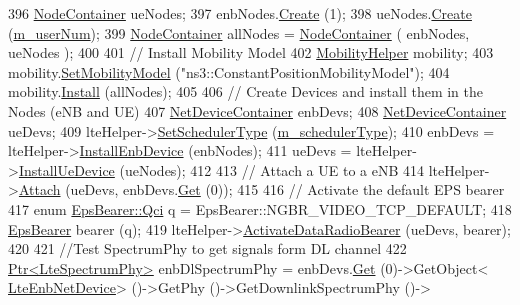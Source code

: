 \begin{DoxyCode}
396   \hyperlink{classns3_1_1NodeContainer}{NodeContainer} ueNodes;
397   enbNodes.\hyperlink{classns3_1_1NodeContainer_a787f059e2813e8b951cc6914d11dfe69}{Create} (1);
398   ueNodes.\hyperlink{classns3_1_1NodeContainer_a787f059e2813e8b951cc6914d11dfe69}{Create} (\hyperlink{classLteFrTestCase_a0fd46ca7afd0126775b0dfe0e082d634}{m\_userNum});
399   \hyperlink{classns3_1_1NodeContainer}{NodeContainer} allNodes = \hyperlink{classns3_1_1NodeContainer}{NodeContainer} ( enbNodes, ueNodes );
400 
401   \textcolor{comment}{// Install Mobility Model}
402   \hyperlink{classns3_1_1MobilityHelper}{MobilityHelper} mobility;
403   mobility.\hyperlink{classns3_1_1MobilityHelper_a030275011b6f40682e70534d30280aba}{SetMobilityModel} (\textcolor{stringliteral}{"ns3::ConstantPositionMobilityModel"});
404   mobility.\hyperlink{classns3_1_1MobilityHelper_a07737960ee95c0777109cf2994dd97ae}{Install} (allNodes);
405 
406   \textcolor{comment}{// Create Devices and install them in the Nodes (eNB and UE)}
407   \hyperlink{classns3_1_1NetDeviceContainer}{NetDeviceContainer} enbDevs;
408   \hyperlink{classns3_1_1NetDeviceContainer}{NetDeviceContainer} ueDevs;
409   lteHelper->\hyperlink{classns3_1_1LteHelper_a8f86e55b8b80a81732c4b2df00fb25d5}{SetSchedulerType} (\hyperlink{classLteStrictFrTestCase_a98552dea8dd02f0d9edb7d71ca4ba533}{m\_schedulerType});
410   enbDevs = lteHelper->\hyperlink{classns3_1_1LteHelper_a5e009ad35ef85f46b5a6099263f15a03}{InstallEnbDevice} (enbNodes);
411   ueDevs = lteHelper->\hyperlink{classns3_1_1LteHelper_ac9cd932d7de92811cfa953c2e3b2fc9f}{InstallUeDevice} (ueNodes);
412 
413   \textcolor{comment}{// Attach a UE to a eNB}
414   lteHelper->\hyperlink{classns3_1_1LteHelper_a9466743f826aa2652a87907b7f0a1c87}{Attach} (ueDevs, enbDevs.\hyperlink{classns3_1_1NetDeviceContainer_a677d62594b5c9d2dea155cc5045f4d0b}{Get} (0));
415 
416   \textcolor{comment}{// Activate the default EPS bearer}
417   \textcolor{keyword}{enum} \hyperlink{structns3_1_1EpsBearer_aecf0c67109c5eb4ec0b07226fff5885e}{EpsBearer::Qci} q = EpsBearer::NGBR\_VIDEO\_TCP\_DEFAULT;
418   \hyperlink{structns3_1_1EpsBearer}{EpsBearer} bearer (q);
419   lteHelper->\hyperlink{classns3_1_1LteHelper_ac896e16cf162e4beeaa292d39ab1b700}{ActivateDataRadioBearer} (ueDevs, bearer);
420 
421   \textcolor{comment}{//Test SpectrumPhy to get signals form DL channel}
422   \hyperlink{classns3_1_1Ptr}{Ptr<LteSpectrumPhy>} enbDlSpectrumPhy = enbDevs.\hyperlink{classns3_1_1NetDeviceContainer_a677d62594b5c9d2dea155cc5045f4d0b}{Get} (0)->GetObject<
      \hyperlink{classns3_1_1LteEnbNetDevice}{LteEnbNetDevice}> ()->GetPhy ()->GetDownlinkSpectrumPhy ()->

\end{DoxyCode}
